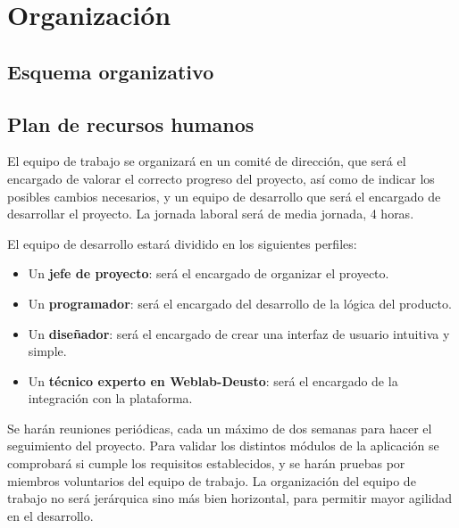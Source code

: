 \chapter{Organización}

\section{Esquema organizativo}

\section{Plan de recursos humanos}

El equipo de trabajo se organizará en un comité de dirección, que será el encargado de valorar el
correcto progreso del proyecto, así como de indicar los posibles cambios necesarios, y un equipo de
desarrollo que será el encargado de desarrollar el proyecto. La jornada laboral será de media
jornada, 4 horas.

El equipo de desarrollo estará dividido en los siguientes perfiles:

\begin{itemize}
\item Un \textbf{jefe de proyecto}: será el encargado de organizar el proyecto.

\item Un \textbf{programador}: será el encargado del desarrollo de la lógica del producto.

\item Un \textbf{diseñador}: será el encargado de crear una interfaz de usuario intuitiva y simple.

\item Un \textbf{técnico experto en Weblab-Deusto}: será el encargado de la integración con la
plataforma.
\end{itemize}

Se harán reuniones periódicas, cada un máximo de dos semanas para hacer el seguimiento del proyecto.
Para validar los distintos módulos de la aplicación se comprobará si cumple los requisitos
establecidos, y se harán pruebas por miembros voluntarios del equipo de trabajo. La organización del
equipo de trabajo no será jerárquica sino más bien horizontal, para permitir mayor agilidad en el
desarrollo.

